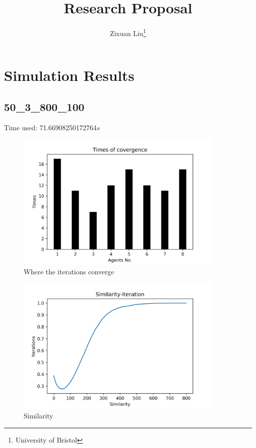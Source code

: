 \documentclass[a4paper,12pt]{article}
\title{Research Proposal}
\author{Zixuan Liu\thanks{University of Bristol}}
\begin{document}
	\section{Simulation Results}
	\graphicspath{{figs/}}
	\subsection{50\_3\_800\_100}
	Time used: 71.66908250172764${s}$
	\begin{figure}[H]
		\centering
		\includegraphics[width=0.9\textwidth]{agt50_3_800_100}
		\caption{Where the iterations converge}\label{agt50_3_800_100}
	\end{figure}
%
	\begin{figure}[H]
		\centering
		\includegraphics[width=0.9\textwidth]{Sim50_3_800_100}
		\caption{Similarity}\label{Sim50_3_800_100}
	\end{figure}
%
\end{document}
